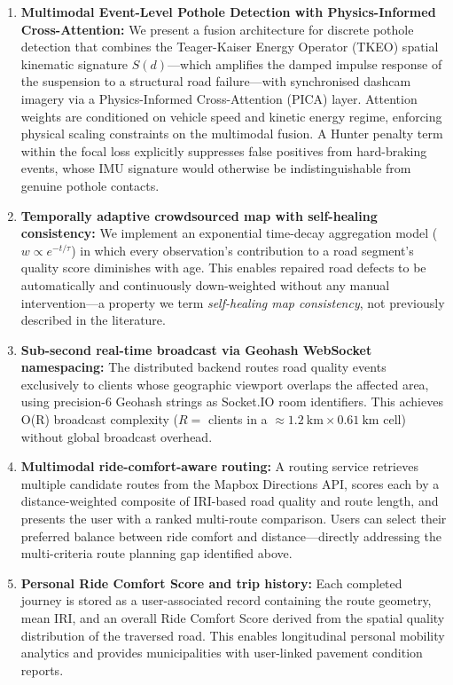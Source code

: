 \documentclass[conference]{IEEEtran}
\begin{document}
\begin{enumerate}
    \item \textbf{Multimodal Event-Level Pothole Detection with Physics-Informed Cross-Attention:} We present a fusion architecture for discrete pothole detection that combines the Teager-Kaiser Energy Operator (TKEO) spatial kinematic signature $S(d)$---which amplifies the damped impulse response of the suspension to a structural road failure---with synchronised dashcam imagery via a Physics-Informed Cross-Attention (PICA) layer.
Attention weights are conditioned on vehicle speed and kinetic energy regime, enforcing physical scaling constraints on the multimodal fusion.
A Hunter penalty term within the focal loss explicitly suppresses false positives from hard-braking events, whose IMU signature would otherwise be indistinguishable from genuine pothole contacts.

    \item \textbf{Temporally adaptive crowdsourced map with self-healing consistency:} We implement an exponential time-decay aggregation model ($w \propto e^{-t/\tau}$) in which every observation's contribution to a road segment's quality score diminishes with age.
This enables repaired road defects to be automatically and continuously down-weighted without any manual intervention---a property we term \textit{self-healing map consistency}, not previously described in the literature.

    \item \textbf{Sub-second real-time broadcast via Geohash WebSocket namespacing:} The distributed backend routes road quality events exclusively to clients whose geographic viewport overlaps the affected area, using precision-6 Geohash strings as Socket.IO room identifiers.
This achieves O(R) broadcast complexity ($R =$ clients in a $\approx 1.2~\text{km} \times 0.61~\text{km}$ cell) without global broadcast overhead.

    \item \textbf{Multimodal ride-comfort-aware routing:} A routing service retrieves multiple candidate routes from the Mapbox Directions API, scores each by a distance-weighted composite of IRI-based road quality and route length, and presents the user with a ranked multi-route comparison.
Users can select their preferred balance between ride comfort and distance---directly addressing the multi-criteria route planning gap identified above.

    \item \textbf{Personal Ride Comfort Score and trip history:} Each completed journey is stored as a user-associated record containing the route geometry, mean IRI, and an overall Ride Comfort Score derived from the spatial quality distribution of the traversed road.
This enables longitudinal personal mobility analytics and provides municipalities with user-linked pavement condition reports.
\end{enumerate}
\end{document}
